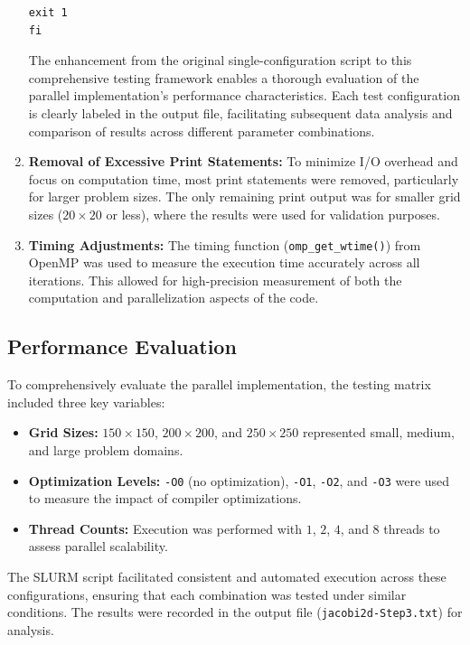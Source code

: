 \documentclass{article}
\begin{document}
\begin{enumerate}
\begin{lstlisting}[style=BashStyle, caption={Error Handling}]
    exit 1
fi
\end{lstlisting}
    The enhancement from the original single-configuration script to this comprehensive testing framework enables a thorough evaluation of the parallel implementation's performance characteristics. Each test configuration is clearly labeled in the output file, facilitating subsequent data analysis and comparison of results across different parameter combinations.
    \item \textbf{Removal of Excessive Print Statements:} To minimize I/O overhead and focus on computation time, most print statements were removed, particularly for larger problem sizes. The only remaining print output was for smaller grid sizes ($20\times20$ or less), where the results were used for validation purposes.
    \item \textbf{Timing Adjustments:} The timing function (\texttt{omp\_get\_wtime()}) from OpenMP was used to measure the execution time accurately across all iterations. This allowed for high-precision measurement of both the computation and parallelization aspects of the code.
\end{enumerate}

\subsection{Performance Evaluation}

To comprehensively evaluate the parallel implementation, the testing matrix included three key variables:

\begin{itemize}
    \item \textbf{Grid Sizes:} $150\times150$, $200\times200$, and $250\times250$ represented small, medium, and large problem domains.
    \item \textbf{Optimization Levels:} \texttt{-O0} (no optimization), \texttt{-O1}, \texttt{-O2}, and \texttt{-O3} were used to measure the impact of compiler optimizations.
    \item \textbf{Thread Counts:} Execution was performed with $1$, $2$, $4$, and $8$ threads to assess parallel scalability.
\end{itemize}

The SLURM script facilitated consistent and automated execution across these configurations, ensuring that each combination was tested under similar conditions. The results were recorded in the output file (\texttt{jacobi2d-Step3.txt}) for analysis.
\end{document}
